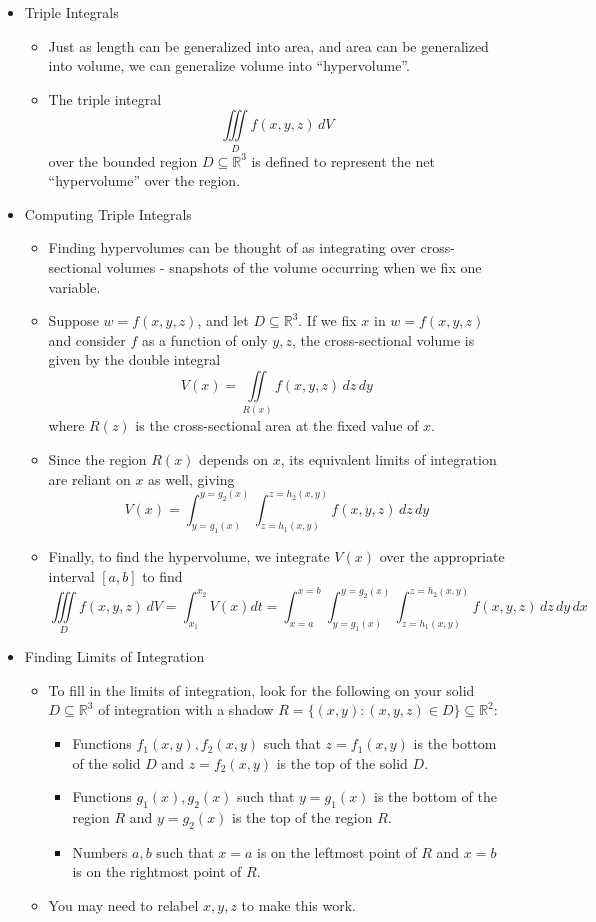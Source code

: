 \documentclass[12pt]{article}
\theoremstyle{plain}
\theoremstyle{definition}
\theoremstyle{remark}
\begin{document}
	\begin{itemize}
	
	\item Triple Integrals
		
		\begin{itemize}
		\item Just as length can be generalized into area, and area can be generalized into volume, we can generalize volume into ``hypervolume''.
		\item The triple integral \[\iiint\limits_D f(x,y,z)\, dV\] over the bounded region $D \subseteq \mathbb{R}^3$ is defined to represent the net ``hypervolume'' over the region.
		\end{itemize}
		
	\item Computing Triple Integrals
	
		\begin{itemize}
		\item Finding hypervolumes can be thought of as integrating over cross-sectional volumes - snapshots of the volume occurring when we fix one variable.
		\item Suppose $w=f(x,y,z)$, and let $D\subseteq \mathbb{R}^3$. If we fix $x$ in $w=f(x,y,z)$ and consider $f$ as a function of only $y,z$, the cross-sectional volume is given by the double integral \[V(x) = \iint\limits_{R(x)} f(x,y,z)\,dz\,dy\] where $R(z)$ is the cross-sectional area at the fixed value of $x$.
		\item Since the region $R(x)$ depends on $x$, its equivalent limits of integration are reliant on $x$ as well, giving \[V(x) = \int_{y=g_1(x)}^{y=g_2(x)}\int_{z=h_1(x,y)}^{z=h_2(x,y)}f(x,y,z)\,dz\,dy\]
		\item Finally, to find the hypervolume, we integrate $V(x)$ over the appropriate interval $[a,b]$ to find \[\iiint\limits_D f(x,y,z)\, dV=\int_{x_1}^{x_2}V(x) dt = \int_{x=a}^{x=b} \int_{y=g_1(x)}^{y=g_2(x)}\int_{z=h_1(x,y)}^{z=h_2(x,y)}f(x,y,z)\,dz\,dy\,dx\]
		\end{itemize}
	\newpage	
	\item Finding Limits of Integration
	
		\begin{itemize}
		\item To fill in the limits of integration, look for the following on your solid $D\subseteq \mathbb{R}^3$ of integration with a shadow $R=\{(x,y):(x,y,z)\in D\}\subseteq \mathbb{R}^2$:
			\begin{itemize}
			\item Functions $f_1(x,y),f_2(x,y)$ such that $z=f_1(x,y)$ is the bottom of the solid $D$ and $z=f_2(x,y)$ is the top of the solid $D$.
			\item Functions $g_1(x),g_2(x)$ such that $y=g_1(x)$ is the bottom of the region $R$ and $y=g_2(x)$ is the top of the region $R$.
			\item Numbers $a,b$ such that $x=a$ is on the leftmost point of $R$ and $x=b$ is on the rightmost point of $R$.
			\end{itemize}
		\item You may need to relabel $x,y,z$ to make this work.
		\end{itemize}
		

\end{itemize}
\end{document}
